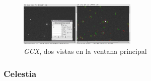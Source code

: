 \begin{figure}[!htb]
    \centering
    \includegraphics[width=0.5\textwidth]{img/gcx}
    \caption{\emph{GCX}, dos vistas en la ventana principal}
    \label{fig:gcx}
\end{figure}

\subsubsection{Celestia}

% 
% 
% 
% 
% 
% 
% 


